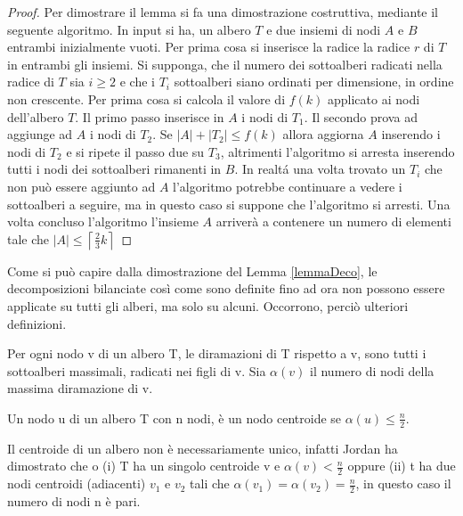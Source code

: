 \begin{proof}
Per dimostrare il lemma si fa una dimostrazione costruttiva, mediante il seguente algoritmo.
In input si ha, un albero $ T $ e due insiemi di nodi $ A $ e $ B $ entrambi inizialmente vuoti.
Per prima cosa si inserisce la radice la radice $ r $ di $ T $ in entrambi gli insiemi.
Si supponga, che il numero dei sottoalberi radicati nella radice di $ T $ sia $ i \ge 2 $ e che i $ T_i $ sottoalberi siano ordinati per dimensione, in ordine non crescente.
Per prima cosa si calcola il valore di $ f(k) $ applicato ai nodi dell'albero $ T $.
Il primo passo inserisce in $ A $ i nodi di $ T_1 $.
Il secondo prova ad aggiunge ad $ A $ i nodi di $ T_2 $.
Se $ |A| + |T_2| \le f(k) $ allora aggiorna $ A $ inserendo i nodi di $ T_2 $ e si ripete il passo due su $ T_3 $, altrimenti l'algoritmo si arresta inserendo tutti i nodi dei sottoalberi rimanenti in $ B $.
In realt\'a una volta trovato un $ T_i $ che non pu\`o essere aggiunto ad $ A $ l'algoritmo potrebbe continuare a vedere i sottoalberi a seguire, ma in questo caso si suppone che l'algoritmo si arresti.
Una volta concluso l'algoritmo l'insieme $ A $ arriver\`a a contenere un numero di elementi tale che $ |A| \le \left\lceil \frac{2}{3}  k  \right\rceil  $
\end{proof}

Come si pu\`o capire dalla dimostrazione del Lemma \ref{lemmaDeco}, le decomposizioni bilanciate cos\`i come sono definite fino ad ora non possono essere applicate su tutti gli alberi, ma solo su alcuni.
Occorrono, perci\`o ulteriori definizioni.
   
\begin{definizione}
Per ogni nodo v di un albero T, le diramazioni di T  rispetto a v, sono tutti i sottoalberi massimali, radicati nei figli di v. 
Sia $\alpha(v)$ il numero di nodi della massima diramazione di v. 

Un nodo u di un albero T con n nodi, \`e un nodo centroide se $\alpha(u)\le\frac{n}{2}$.

Il centroide di un albero non \`e necessariamente unico, infatti Jordan \cite{jordan1869assemblages}  ha dimostrato che o (i) T ha un singolo centroide v e $\alpha(v) < \frac{n}{2}$ oppure (ii) t ha due nodi centroidi (adiacenti) $v_1$ e $v_2$ tali che $\alpha(v_1) = \alpha(v_2) = \frac{n}{2}$, in questo caso il numero di nodi n \`e pari.
\end{definizione}\mbox{}


